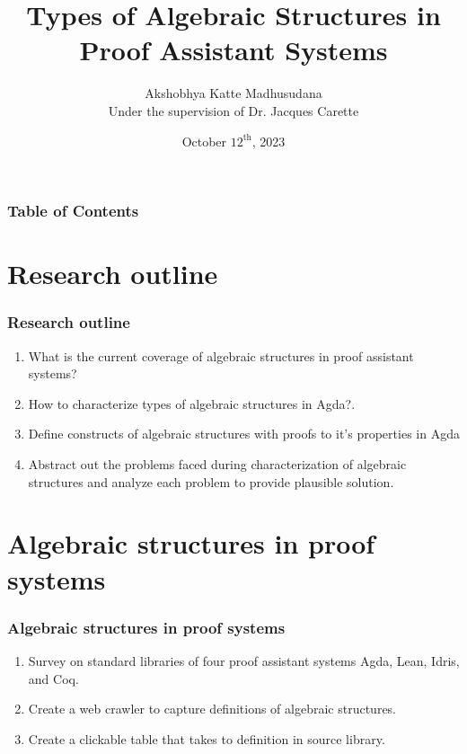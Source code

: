 \documentclass[xcolor={dvipsnames}]{beamer}
\title[Algebra in Proof Systems]{Types of Algebraic Structures in Proof Assistant Systems}
\author[Akshobhya K M]{Akshobhya Katte Madhusudana\\\small{}Under the supervision of Dr. Jacques Carette}
\institute[McMaster University]{McMaster University}
\date{October $12^{\text{th}}$, 2023}
\begin{document}
\frame{\titlepage}


\begin{frame}
\frametitle{Table of Contents}
\tableofcontents
\end{frame}

\section{Research outline}

\begin{frame}
  \frametitle{Research outline}

  \begin{enumerate}
    \item What is the current coverage of algebraic structures in proof assistant systems?
    \item How to characterize types of algebraic structures in Agda?. 
    \item Define constructs of algebraic structures with proofs to it's properties in Agda
    \item Abstract out the problems faced during characterization of algebraic structures and analyze each problem to provide plausible solution.    
  \end{enumerate}
\end{frame}

\section{Algebraic structures in proof systems}

\begin{frame}
  \frametitle{Algebraic structures in proof systems}
  \begin{enumerate}
    \item Survey on standard libraries of four proof assistant systems Agda, Lean, Idris, and Coq.
    \item Create a web crawler to capture definitions of algebraic structures.
    \item Create a clickable table that takes to definition in source library.
  \end{enumerate}

\end{frame}
\end{document}
